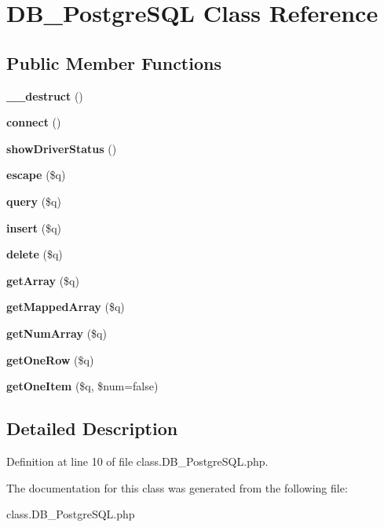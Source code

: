 \section{DB\_\-PostgreSQL Class Reference}
\label{classDB__PostgreSQL}
\subsection*{Public Member Functions}
\begin{CompactItemize}
\item 
{\bf \_\-\_\-destruct} ()\label{classDB__PostgreSQL_ba3e6e6d5b119a196bb77fbd5d98fd29}

\item 
{\bf connect} ()\label{classDB__PostgreSQL_26d4db41ab37a9c32617bc7546cbb722}

\item 
{\bf showDriverStatus} ()\label{classDB__PostgreSQL_605568f9e492af79ca8cd9da84161943}

\item 
{\bf escape} (\$q)\label{classDB__PostgreSQL_41c4c10a94d183234b4a3716bd0d361c}

\item 
{\bf query} (\$q)\label{classDB__PostgreSQL_26d51039dc7207b462debcb140c93907}

\item 
{\bf insert} (\$q)\label{classDB__PostgreSQL_ad9c274ff1db8fb3920f4acc49f002e3}

\item 
{\bf delete} (\$q)\label{classDB__PostgreSQL_ab1758a83fc3ca0c5d341c2a273dbb82}

\item 
{\bf getArray} (\$q)\label{classDB__PostgreSQL_f4ec75411c617b8b07cb77828b9078eb}

\item 
{\bf getMappedArray} (\$q)\label{classDB__PostgreSQL_368ccb577d68b39a68a7a864bc63da9c}

\item 
{\bf getNumArray} (\$q)\label{classDB__PostgreSQL_5f75f0e3da984d70e30e2bee7dd0cf08}

\item 
{\bf getOneRow} (\$q)\label{classDB__PostgreSQL_7f565bc601e334e6f26be6bc563641d5}

\item 
{\bf getOneItem} (\$q, \$num=false)\label{classDB__PostgreSQL_01b7af26817c63cc883338503408d052}

\end{CompactItemize}


\subsection{Detailed Description}


Definition at line 10 of file class.DB\_\-PostgreSQL.php.

The documentation for this class was generated from the following file:\begin{CompactItemize}
\item 
class.DB\_\-PostgreSQL.php\end{CompactItemize}

